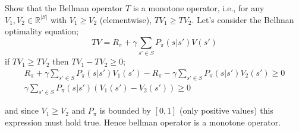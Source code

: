 \documentclass{article}
\begin{document}
\begin{tcolorbox}[colback=blue!5!white,colframe=blue!75!black,title=Question 3]
    Show that the Bellman operator $T$ is a monotone operator, i.e., for any $V_1, V_2 \in \mathbb{R}^{|S|}$ with
    $V_1 \geq V_2$ (elementwise), $TV_1 \geq TV_2$.
    \tcblower
    Let's consider the Bellman optimality equation;
    \begin{equation}
        T V = R_\pi + \gamma \sum\limits_{s' \in S} P_\pi (s | s') V(s')
    \end{equation}
    if $TV_1 \geq TV_2$ then $TV_1 - TV_2 \geq 0$;
    \begin{equation}
        \begin{split}
            R_\pi + \gamma \sum\limits_{s' \in S} P_\pi (s | s') V_1(s') - R_\pi - \gamma \sum\limits_{s' \in S} P_\pi (s | s') V_2(s') \geq 0\\
            \gamma \sum\limits_{s' \in S} P_\pi (s | s') (V_1(s') - V_2(s')) \geq 0
        \end{split}
    \end{equation}

and since $V_1 \geq V_2$ and $P_\pi$ is bounded by $[0,1]$ (only positive values) this expression must hold true. Hence bellman operator
is a monotone operator.
\end{tcolorbox}
\end{document}

